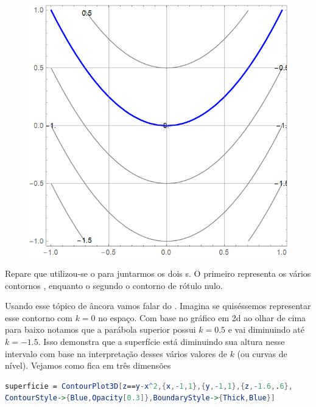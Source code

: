 \documentclass[a4paper, 12pt]{article}
\begin{document}
	\begin{figure}[!h]
		\centering
		\includegraphics[scale=.37]{images/ContourZero}
	\end{figure}

	Repare que utilizou-se o  para juntarmos os dois s. O primeiro representa os vários contornos , enquanto o segundo o contorno de rótulo nulo.
	
	Usando esse tópico de âncora vamos falar do . Imagina se quiséssemos representar esse contorno com $k=0$ no espaço. Com base no gráfico em 2d ao olhar de cima para baixo notamos que a parábola superior possui $k=0.5$ e vai diminuindo até $k=-1.5$. Isso demonstra que a superfície está diminuindo sua altura nesse intervalo com base na interpretação desses vários valores de $k$ (ou curvas de nível). Vejamos como fica em três dimensões
	
\begin{lstlisting}[language=Mathematica]
superficie = ContourPlot3D[z==y-x^2,{x,-1,1},{y,-1,1},{z,-1.6,.6}, 
ContourStyle->{Blue,Opacity[0.3]},BoundaryStyle->{Thick,Blue}]
\end{lstlisting}
\end{document}
